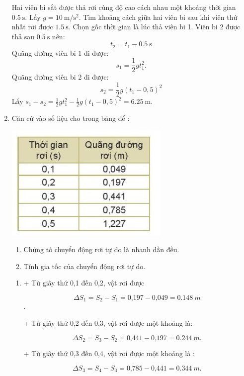 \begin{enumerate}[label=\bfseries Bài \arabic*:]
	
	{
		Hai viên bi sắt được thả rơi cùng độ cao cách nhau một khoảng thời gian $\SI{0,5}{\second}$. Lấy $g = \SI{10}{\meter/\second^2}$. Tìm khoảng cách giữa hai viên bi sau khi viên thứ nhất rơi được $\SI{1,5}{\second}$.
	}
	\hideall
	{	
		Chọn gốc thời gian là lúc thả viên bi 1. Viên bi 2 được thả sau $\SI{0,5}{\second}$ nên:
		$$t_2=t_1-\SI{0,5}{\second}$$
		Quãng đường viên bi 1 đi được:
		$$s_1=\frac{1}{2}gt_1^2.$$
		Quãng đường viên bi 2 đi được:
		$$s_2=\frac{1}{2}g(t_1-0,5)^2$$
		Lấy $s_1-s_2=\frac{1}{2}gt_1^2-\frac{1}{2}g(t_1-0,5)^2=\SI{6,25}{\meter}$.
	}
	
	\item {}
	
	
	{
		Căn cứ vào số liệu cho trong bảng để :
		\begin{center}
			\includegraphics[scale=1]{../figs/VN10-2022-PH-TP013-1.jpg}
		\end{center}
		\begin{enumerate}[label=\alph*)]
			\item Chứng tỏ chuyển động rơi tự do là nhanh dần đều. 
			\item Tính gia tốc của chuyển động rơi tự do.
		\end{enumerate}
	}
	\hideall
	{	
		\begin{enumerate}[label=\alph*)]
			\item 
			+ Từ giây thứ 0,1 đến 0,2, vật rơi được
			
			$$\Delta S_1 = S_2 -  S_1=\text{0,197} - \text{0,049} = \SI{0,148}{m}$$.
			
			+ Từ giây thứ 0,2 đến 0,3, vật rơi được một khoảng là: 
			
			$$\Delta S_2 = S_3 -  S_2= \text{0,441} - \text{0,197}= \SI{0,244}{m}.$$
			
			+ Từ giây thứ 0,3 đến 0,4, vật rơi được một khoảng là :
			
			$$\Delta S_3= S_4 - S_3= \text{0,785} - \text{0,441}= \SI{0,344}{m}.$$
			

\end{enumerate}}
\end{enumerate}
